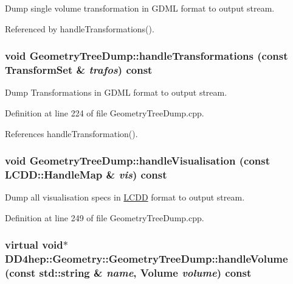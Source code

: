 Dump single volume transformation in GDML format to output stream. 

Referenced by handleTransformations().\hypertarget{class_d_d4hep_1_1_geometry_1_1_geometry_tree_dump_a60d1dac798ae2ea18d8576177db5328c}{
\subsubsection[{handleTransformations}]{\setlength{\rightskip}{0pt plus 5cm}void GeometryTreeDump::handleTransformations (const {\bf TransformSet} \& {\em trafos}) const}}
\label{class_d_d4hep_1_1_geometry_1_1_geometry_tree_dump_a60d1dac798ae2ea18d8576177db5328c}


Dump Transformations in GDML format to output stream. 

Definition at line 224 of file GeometryTreeDump.cpp.

References handleTransformation().\hypertarget{class_d_d4hep_1_1_geometry_1_1_geometry_tree_dump_a5478dd607f618b26797e58a8f85b3001}{
\subsubsection[{handleVisualisation}]{\setlength{\rightskip}{0pt plus 5cm}void GeometryTreeDump::handleVisualisation (const {\bf LCDD::HandleMap} \& {\em vis}) const}}
\label{class_d_d4hep_1_1_geometry_1_1_geometry_tree_dump_a5478dd607f618b26797e58a8f85b3001}


Dump all visualisation specs in \hyperlink{class_d_d4hep_1_1_geometry_1_1_l_c_d_d}{LCDD} format to output stream. 

Definition at line 249 of file GeometryTreeDump.cpp.\hypertarget{class_d_d4hep_1_1_geometry_1_1_geometry_tree_dump_a630050d539e73e8fbc2893b03b93a75c}{
\subsubsection[{handleVolume}]{\setlength{\rightskip}{0pt plus 5cm}virtual void$\ast$ DD4hep::Geometry::GeometryTreeDump::handleVolume (const std::string \& {\em name}, \/  {\bf Volume} {\em volume}) const}}
\label{class_d_d4hep_1_1_geometry_1_1_geometry_tree_dump_a630050d539e73e8fbc2893b03b93a75c}


